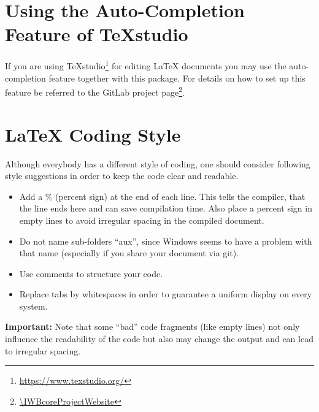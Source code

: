 \section{Using the Auto-Completion Feature of TeXstudio}%
\label{sec:backmatter_autocompletion}%
If you are using TeXstudio\footnote{\url{https://www.texstudio.org/}} for editing LaTeX documents you may use the auto-completion feature together with this package. For details on how to set up this feature be referred to the GitLab project page\footnote{\url{\IWBcoreProjectWebsite}}.\par%
%
%
\section{LaTeX Coding Style}%
Although everybody has a different style of coding, one should consider following style suggestions in order to keep the code clear and readable.\par%
%
\begin{itemize}\itemsep0pt%
    \item Add a \% (percent sign) at the end of each line. This tells the compiler, that the line ends here and can save compilation time. Also place a percent sign in empty lines to avoid irregular spacing in the compiled document.%
    \item Do not name sub-folders ``aux'', since Windows seems to have a problem with that name (especially if you share your document via git).%
    \item Use comments to structure your code.%
    \item Replace tabs by whitespaces in order to guarantee a uniform display on every system.%
\end{itemize}%
%
\textbf{Important:} Note that some ``bad'' code fragments (like empty lines) not only influence the readability of the code but also may change the output and can lead to irregular spacing.\par%
%
%
